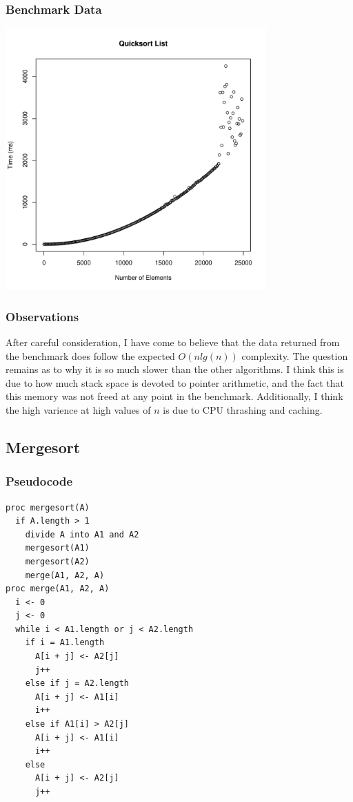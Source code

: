 \documentclass[a4paper,12pt]{article}
\begin{document}
\subsubsection{Benchmark Data}
\includegraphics[height=10cm]{quicksort_list}
\subsubsection{Observations}
After careful consideration, I have come to believe that the data returned from the benchmark does follow the expected $O(nlg(n))$
complexity. The question remains as to why it is so much slower than the other algorithms. I think this is due to how much stack space is devoted to
pointer arithmetic, and the fact that this memory was not freed at any point in the benchmark. Additionally, I think the high varience at high values
of $n$ is due to CPU thrashing and caching.
\subsection{Mergesort}
\subsubsection{Pseudocode}
\begin{verbatim}
proc mergesort(A)
  if A.length > 1
    divide A into A1 and A2
    mergesort(A1)
    mergesort(A2)
    merge(A1, A2, A)
proc merge(A1, A2, A)
  i <- 0
  j <- 0
  while i < A1.length or j < A2.length
    if i = A1.length
      A[i + j] <- A2[j]
      j++
    else if j = A2.length
      A[i + j] <- A1[i]
      i++
    else if A1[i] > A2[j]
      A[i + j] <- A1[i]
      i++
    else 
      A[i + j] <- A2[j]
      j++     
\end{verbatim}
\end{document}
